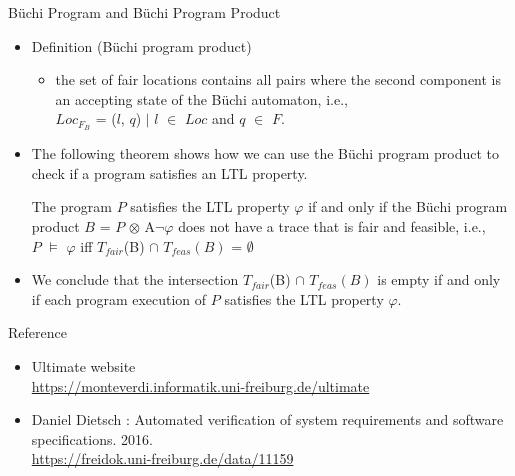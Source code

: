 \documentclass[12pt]{beamer}
\newcommand{\ultimateURL}{\url{https://monteverdi.informatik.uni-freiburg.de/ultimate}}
\begin{document}
\begin{frame}{B\"uchi Program and B\"uchi Program Product}
  	\begin{itemize}
		\item Definition (B\"uchi program product)
		\begin{itemize}
			\item the set of fair locations contains all pairs where the second component is an accepting state of the B\"uchi automaton, i.e., \\ $Loc_{{F}_{B}}$ = {($l$, $q$) $\mid$ $l$ $\in$ $Loc$ and $q$ $\in$ $F$}.
		\end{itemize}
		\item The following theorem shows how we can use the B\"uchi program product to check if a program satisfies an LTL property.
		\begin{theorem}
			The program $P$ satisfies the LTL property $\varphi$ if and only if the Büchi program product $B$ = $P$ $\otimes$ A$\neg\varphi$  does not have a trace that is fair and feasible, i.e.,\\
			$P$ $\models$ $\varphi$ iff $T_{fair}$(B) $\cap$ $T_{feas}(B)$ = $\emptyset$
		\end{theorem}
		\item We conclude that the intersection $T_{fair}$(B) $\cap$ $T_{feas}(B)$ is empty if and only if each program execution of $P$ satisfies the LTL property $\varphi$.
  	\end{itemize}
\end{frame}


\begin{frame}{Reference}
	\begin{itemize}
		\item Ultimate website\\
		\ultimateURL
		\item Daniel Dietsch : Automated verification of system requirements and software specifications. 2016.\\
		\url{https://freidok.uni-freiburg.de/data/11159}
	\end{itemize}
\end{frame}
\end{document}
